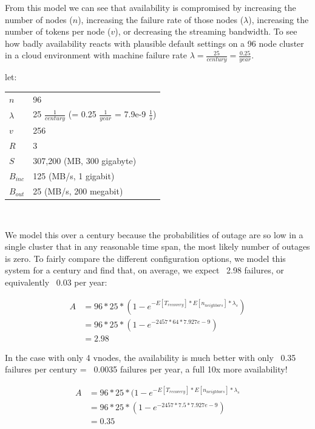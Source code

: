 \documentclass{article}
\makeatletter
\newenvironment{conditions}[1][let:]
  {#1 \begin{tabular}[t]{>{$}l<{$} @{${}={}$} l}}
  {\end{tabular}\\[\belowdisplayskip]}
\makeatother
\begin{document}
From this model we can see that availability is compromised by increasing the
number of nodes ($n$), increasing the failure rate of those nodes ($\lambda$),
increasing the number of tokens per node ($v$), or decreasing the streaming
bandwidth. To see how badly availability reacts with plausible default settings
on a 96 node cluster in a cloud environment with machine failure rate
$\lambda=\frac{25}{century}=\frac{0.25}{year}$.

\begin{conditions}
 n       &  96 \\
 \lambda &  25 $\frac{1}{century}$ (= 0.25 $\frac{1}{year}$ = 7.9e-9 $\frac{1}{s}$) \\
 v       &  256 \\
 R       &  3 \\
 S       &  307,200 (MB, 300 gigabyte) \\
 B_{inc} &  125 (MB/s, 1 gigabit) \\
 B_{out} &  25 (MB/s, 200 megabit) \\
\end{conditions}

We model this over a century because the probabilities of outage are so low in a
single cluster that in any reasonable time span, the most likely number of outages
is zero. To fairly compare the different configuration options, we model this
system for a century and find that, on average, we expect ~2.98 failures, or
equivalently ~0.03 per year:

\begin{equation}
    \begin{split}
    A & = 96 * 25 * (1 - e^{-E[T_{recovery}] * E[n_{neighbors}] * \lambda_{s}}) \\
    & = 96 * 25 * (1 - e^{-2457 * 64 * 7.927e-9}) \\
    & = 2.98
    \end{split}
\end{equation}

In the case with only 4 vnodes, the availability is much better with
only ~0.35 failures per century = ~0.0035 failures per year, a full 10x more
availability!

\begin{equation}
    \begin{split}
    A & = 96 * 25 * (1 - e^{-E[T_{recovery}] * E[n_{neighbors}] * \lambda_{s}} \\
    & = 96 * 25 * (1 - e^{-2457 * 7.5 * 7.927e-9}) \\
    & = 0.35
    \end{split}
\end{equation}
\end{document}
